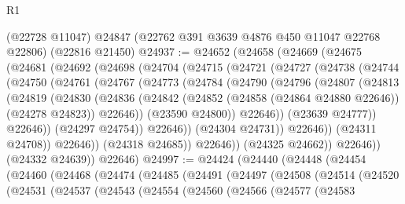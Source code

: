\begin{lexlean}{R1}
\begin{coremodule}
    (@22728 @11047)
    @24847
    (@22762 @391 @3639 @4876 @450 @11047 @22768 @22806)
    (@22816 @21450)
@24937 := @24652
    (@24658
      (@24669
        (@24675
          (@24681
            (@24692
              (@24698
                (@24704
                  (@24715
                    (@24721
                      (@24727
                        (@24738
                          (@24744
                            (@24750
                              (@24761
                                (@24767
                                  (@24773
                                    (@24784
                                      (@24790
                                        (@24796
                                          (@24807
                                            (@24813
                                              (@24819
                                                (@24830
                                                  (@24836
                                                    (@24842
                                                      (@24852
                                                        (@24858 (@24864 @24880 @22646))
                                                        (@24278 @24823))
                                                      @22646))
                                                  (@23590 @24800))
                                                @22646))
                                            (@23639 @24777))
                                          @22646))
                                      (@24297 @24754))
                                    @22646))
                                (@24304 @24731))
                              @22646))
                          (@24311 @24708))
                        @22646))
                    (@24318 @24685))
                  @22646))
              (@24325 @24662))
            @22646))
        (@24332 @24639))
      @22646)
@24997 := @24424
    (@24440
      (@24448
        (@24454
          (@24460
            (@24468
              (@24474
                (@24485
                  (@24491
                    (@24497
                      (@24508
                        (@24514
                          (@24520
                            (@24531
                              (@24537
                                (@24543
                                  (@24554
                                    (@24560
                                      (@24566
                                        (@24577
                                          (@24583

\end{coremodule}
\end{lexlean}
